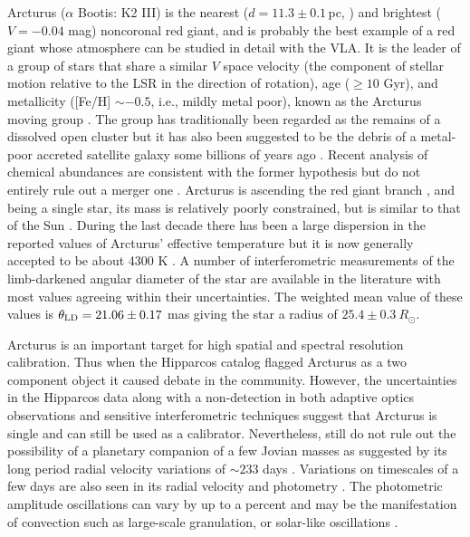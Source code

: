 Arcturus ($\alpha$ Bootis: K2 III) is the nearest ($d=11.3 \pm 0.1$\,pc, \cite{perryman_1997}) and brightest ($V=-0.04$ mag) noncoronal red giant, and is probably the best example of a red giant whose atmosphere can be studied in detail with the VLA. It is the leader of a group of stars that share a similar $V$  space velocity (the component of stellar motion relative to the LSR in the direction of rotation), age ($\geq10$ Gyr), and metallicity ([Fe/H] $\sim -0.5$, i.e., mildly metal poor), known as the Arcturus moving group \citep{eggen_1971}. The group has traditionally been regarded as the remains of a dissolved open cluster \citep[e.g.,][]{eggen_1971,eggen_1996} but it has also been suggested to be  the debris of a metal-poor accreted satellite galaxy some billions of years ago \citep{navarro_2004}. Recent analysis of chemical abundances are consistent with the former hypothesis but do not entirely rule out a merger one \citep{williams_2009}. Arcturus is ascending the red giant branch \citep{abia_2012}, and being a single star, its mass is relatively poorly constrained, but is similar to that of the Sun \citep[$0.8 \pm 0.2 \ M_{\odot}$ by][]{kallinger_2010}. During the last decade there has been a large dispersion in the reported values of Arcturus' effective temperature \citep[i.e., $3850 < T_{e} <4630$\,K,][]{griffin_1996} but it is now generally accepted to be about 4300 K \citep{di_benedetto_1993,griffin_1999}. A number of interferometric measurements of the limb-darkened angular diameter of the star are available in the literature with most values agreeing within their uncertainties. The weighted mean value of these values is $\theta _{\rm{LD}}= 21.06\pm0.17$ mas \citep{ramirez_2011} giving the star a radius of $25.4\pm 0.3\ R_{\odot}$.

Arcturus is an important target for high spatial and spectral resolution calibration. Thus when the Hipparcos catalog flagged Arcturus as a two component object \citep{perryman_1997} it caused debate in the community. However, the uncertainties in the  Hipparcos data \citep{Soderhjelm_1998O} along with a non-detection in both adaptive optics observations \citep{turner_1999} and sensitive interferometric techniques \citep{lacour_2008} suggest that Arcturus is single and can still be used as a calibrator. Nevertheless, \cite{lacour_2008} still do not rule out the possibility of a planetary companion of a few Jovian masses as suggested by its long period radial velocity variations of $\sim 233$ days \citep{hatzes_1993,brown_2007}. Variations on timescales of a few days are also seen in its radial velocity \citep{merline_1999} and photometry \citep{retter_2003}. The photometric amplitude oscillations can vary by up to a percent and may be the manifestation of convection such as large-scale granulation, or solar-like oscillations \citep{dziembowski_2001}. 

